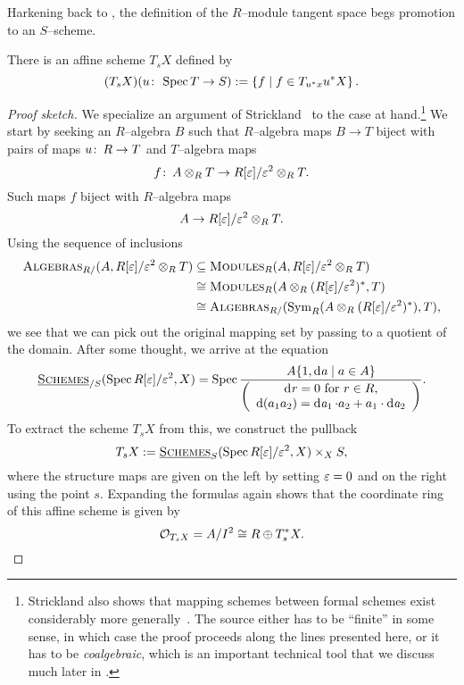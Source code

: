 Harkening back to , the definition of the \(R\)--module tangent space begs promotion to an \(S\)--scheme.
\begin{lemma}\label{ConstructionTangentAffineScheme}
There is an affine scheme \(T_s X\) defined by \[(T_s X)(u\colon\thinspace \operatorname{Spec} T \to S) := \left\{ f \mid f \in T_{u^* x} u^* X \right\}.\]
\end{lemma}
\begin{proof}[Proof sketch]
We specialize an argument of Strickland~\cite[Proposition 2.94]{StricklandFSFG} to the case at hand.\footnote{Strickland also shows that mapping schemes between formal schemes exist considerably more generally~\cite[Theorem 4.69]{StricklandFSFG}.  The source either has to be ``finite'' in some sense, in which case the proof proceeds along the lines presented here, or it has to be \textit{coalgebraic}, which is an important technical tool that we discuss much later in .}  We start by seeking an \(R\)--algebra \(B\) such that \(R\)--algebra maps \(B \to T\) biject with pairs of maps \(u\colon\thinspace R \to T\) and \(T\)--algebra maps \[f\colon\thinspace A \otimes_R T \to R[\varepsilon] / \varepsilon^2 \otimes_R T.\]  Such maps \(f\) biject with \(R\)--algebra maps \[A \to R[\varepsilon] / \varepsilon^2 \otimes_R T.\]  Using the sequence of inclusions
\begin{align*}
\normalfont\textsc{Algebras}_{R/}(A, R[\varepsilon] / \varepsilon^2 \otimes_R T) & \subseteq \normalfont\textsc{Modules}_R(A, R[\varepsilon] / \varepsilon^2 \otimes_R T) \\
& \cong \normalfont\textsc{Modules}_R(A \otimes_R (R[\varepsilon] / \varepsilon^2)^*, T) \\
& \cong \normalfont\textsc{Algebras}_{R/}(\operatorname{Sym}_R(A \otimes_R (R[\varepsilon] / \varepsilon^2)^*), T),
\end{align*}
we see that we can pick out the original mapping set by passing to a quotient of the domain.  After some thought, we arrive at the equation \[\operatorname{\underline{\smash{\normalfont\textsc{Schemes}}}}_{/S}(\operatorname{Spec} R[\varepsilon] / \varepsilon^2, X) = \operatorname{Spec} \frac{A\{1, \operatorname{d\mathit{a}} \mid a \in A\}}{\left( \begin{array}{c} \text{\(\operatorname{d\mathit{r}} = 0\) for \(r \in R\)}, \\ \operatorname{d}(a_1 a_2) = \operatorname{d\mathit{a}_1} \cdot a_2 + a_1 \cdot \operatorname{d\mathit{a}_2} \end{array} \right)} .\]  To extract the scheme \(T_s X\) from this, we construct the pullback \[T_s X := \operatorname{\underline{\smash{\normalfont\textsc{Schemes}}}}_S(\operatorname{Spec} R[\varepsilon] / \varepsilon^2, X) \times_X S,\] where the structure maps are given on the left by setting \(\varepsilon = 0\) and on the right using the point \(s\).  Expanding the formulas again shows that the coordinate ring of this affine scheme is given by \[\mathcal{O}_{T_s X} = A / I^2 \cong R \oplus T^*_s X. \qedhere\]
\end{proof}

